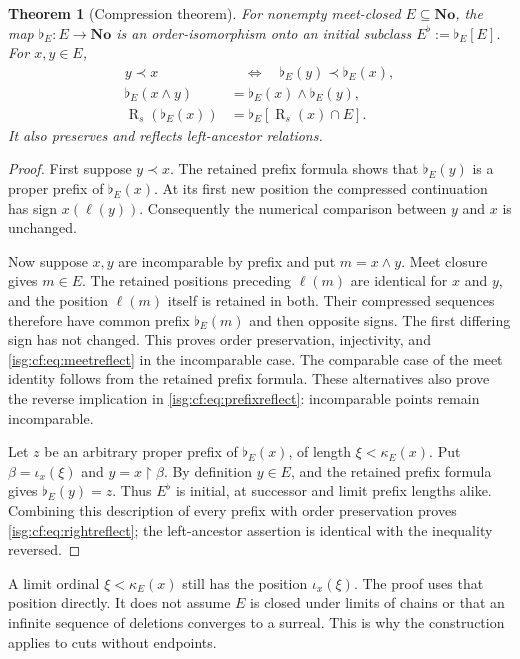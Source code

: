 \documentclass[11pt]{article}
\newtheorem{theorem}{Theorem}[section]
\theoremstyle{definition}
\theoremstyle{remark}
\newcommand{\No}{\ensuremath{\mathbf{No}}}
\newcommand{\Rs}{\operatorname{R}_{s}}
\newcommand{\len}{\ell}
\newcommand{\pr}{\mathrel{\prec}}
\newcommand{\cmp}[1]{\flat_{#1}}
\begin{document}
\begin{theorem}[Compression theorem]\label{isg:cf:thm:compression}
For nonempty meet-closed $E\subseteq\No$, the map
$\cmp E:E\to\No$ is an order-isomorphism onto an initial subclass
$E^\flat:=\cmp E[E]$. For $x,y\in E$,
\begin{align}
 y\pr x&\quad\Longleftrightarrow\quad
       \cmp E(y)\pr\cmp E(x),\label{isg:cf:eq:prefixreflect}\\
 \cmp E(x\wedge y)&=\cmp E(x)\wedge\cmp E(y),\label{isg:cf:eq:meetreflect}\\
 \Rs(\cmp E(x))&=\cmp E[\Rs(x)\cap E].\label{isg:cf:eq:rightreflect}
\end{align}
It also preserves and reflects left-ancestor relations.
\end{theorem}
\begin{proof}
First suppose $y\pr x$. The retained prefix formula shows that
$\cmp E(y)$ is a proper prefix of $\cmp E(x)$. At its first new
position the compressed continuation has sign $x(\len(y))$.
Consequently the numerical comparison between $y$ and $x$ is unchanged.

Now suppose $x,y$ are incomparable by prefix and put $m=x\wedge y$.
Meet closure gives $m\in E$. The retained positions preceding
$\len(m)$ are identical for $x$ and $y$, and the position $\len(m)$
itself is retained in both. Their compressed sequences therefore have
common prefix $\cmp E(m)$ and then opposite signs. The first differing
sign has not changed. This proves order preservation, injectivity, and
\eqref{isg:cf:eq:meetreflect} in the incomparable case. The comparable
case of the meet identity follows from the retained prefix formula.
These alternatives also prove the reverse implication in
\eqref{isg:cf:eq:prefixreflect}: incomparable points remain incomparable.

Let $z$ be an arbitrary proper prefix of $\cmp E(x)$, of length
$\xi<\kappa_E(x)$. Put $\beta=\iota_x(\xi)$ and
$y=x\restriction\beta$. By definition $y\in E$, and the retained
prefix formula gives $\cmp E(y)=z$. Thus $E^\flat$ is initial, at
successor and limit prefix lengths alike. Combining this description
of every prefix with order preservation proves
\eqref{isg:cf:eq:rightreflect}; the left-ancestor assertion is identical
with the inequality reversed.
\end{proof}

\begin{remark}\label{isg:cf:rem:limit}
A limit ordinal $\xi<\kappa_E(x)$ still has the position $\iota_x(\xi)$.
The proof uses that position directly. It does not assume $E$ is closed
under limits of chains or that an infinite sequence of deletions
converges to a surreal. This is why the construction applies to cuts
without endpoints.
\end{remark}
\end{document}
